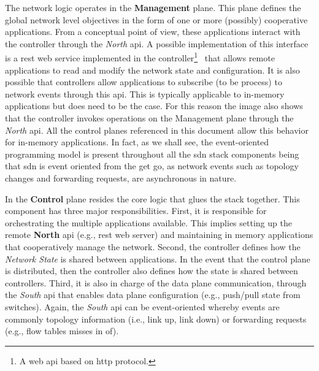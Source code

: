 The network logic operates in the \textbf{Management} plane. 
This plane defines the global network level objectives in the form of one or more (possibly) cooperative applications. 
From a conceptual point of view, these applications interact with the controller through the \emph{North} \gls{api}. 
A possible implementation of this interface is a \gls{rest}  web service implemented in the controller\footnote{A web \gls{api} based on \gls{http} protocol.}~\cite{fielding2002principled} that allows remote applications to read and modify the network state and configuration.  
It is also possible that controllers allow applications to subscribe (to be process) to network events through this \gls{api}. 
This is typically applicable to in-memory applications but does need to be the case. 
For this reason the image also shows that the controller invokes operations on  the Management plane through the \emph{North} \gls{api}. 
All the control planes referenced in this document allow this behavior for in-memory applications. 
In fact, as we shall see, the event-oriented programming model is present throughout all the \gls{sdn} stack components  being that  \gls{sdn} is event oriented from the get go, as network events  such as  topology changes and forwarding requests, are asynchronous in nature. 

In the \textbf{Control} plane resides the core logic that glues the stack together. 
This component has three major responsibilities. 
First, it is responsible for orchestrating the multiple applications available.
This implies setting up the remote \textbf{North} \gls{api} (e.g., \gls{rest} web server) and maintaining in memory applications that cooperatively manage the network. 
Second, the controller  defines how the \emph{Network State} is shared between  applications. 
In the event that the control plane is distributed, then the controller also defines how the state is shared between controllers. 
Third, it is also in charge of the data plane communication, through the \emph{South} \gls{api}  that enables data plane configuration (e.g., push/pull state from switches). 
Again, the \emph{South}  \gls{api} can be event-oriented whereby events are commonly topology information (i.e., link up, link down) or forwarding requests (e.g., flow tables misses in \gls{of}). 

